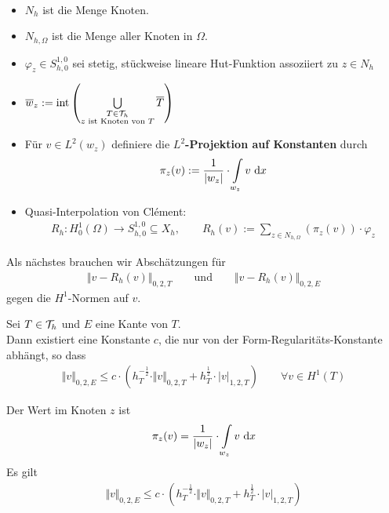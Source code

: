 \begin{notation}\
\begin{itemize}
\item $N_h$ ist die Menge Knoten.
\item $N_{h,\Omega}$ ist die Menge aller Knoten in $\Omega$.
\item $\varphi_z\in S^{1,0}_{h,0}$ sei stetig, stückweise lineare Hut-Funktion assoziiert zu $z\in N_h$
\item $\overline{w}_z:=\operatorname{int}\left(\bigcup\limits_{\begin{subarray}{c}T\in\mathcal{T}_h\\z\text{ ist Knoten von }T\end{subarray}}\overline{T}\right)$
\item Für $v\in L^2(w_z)$ definiere die \textbf{$L^2$-Projektion auf Konstanten} durch 
\begin{align*}
\pi_z (v):=\frac{1}{|w_z|}\cdot\int\limits_{w_z} v\text{ d} x
\end{align*}
\item Quasi-Interpolation von Clément:
\begin{align*}
R_h:H^1_0(\Omega)\to S^{1,0}_{h,0}\subseteq X_h,\qquad
R_h(v):=\sum\limits_{z\in N_{h,\Omega}}\left(\pi_z(v)\right)\cdot\varphi_z
\end{align*}
\end{itemize}
\end{notation}

Als nächstes brauchen wir Abschätzungen für
\begin{align*}
\big\Vert v-R_h(v)\big\Vert_{0,2,T}\qquad\text{und}\qquad\big\Vert v-R_h(v)\big\Vert_{0,2,E}
\end{align*}
gegen die $H^1$-Normen auf $v$.

\begin{theorem}[skalierter Spursatz]\label{theoremSkalierterSpursatz}\enter
Sei $T\in\mathcal{T}_h$ und $E$ eine Kante von $T$.\\
Dann existiert eine Konstante $c$, die nur von der Form-Regularitäts-Konstante abhängt, so dass
\begin{align*}
\Vert v\Vert_{0,2,E}\leq c\cdot\left(h_T^{-\frac{1}{2}}\cdot\Vert v\Vert_{0,2,T}+ h_T^{\frac{1}{2}}\cdot|v|_{1,2,T}\right)\qquad\forall v\in H^1(T)
\end{align*}
\end{theorem}

Der Wert im Knoten $z$ ist
\begin{align*}
\pi_z (v)=\frac{1}{|w_z|}\cdot\int\limits_{w_z}v\text{ d} x
\end{align*}
Es gilt 
\begin{align*}
\Vert v\Vert_{0,2,E}\leq c\cdot\left(h_T^{-\frac{1}{2}}\cdot\Vert v\Vert_{0,2,T}+h_T^{\frac{1}{2}}\cdot|v|_{1,2,T}\right)
\end{align*}

